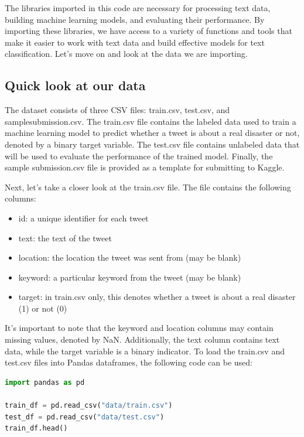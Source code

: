 \documentclass[11pt]{diazessay} %
\begin{document}
The libraries imported in this code are necessary for processing text data, building machine learning models, and evaluating their performance. By importing these libraries, we have access to a variety of functions and tools that make it easier to work with text data and build effective models for text classification. Let's move on and look at the data we are importing.

\subsection{Quick look at our data}

 The dataset consists of three CSV files: train.csv, test.csv, and sample\textunderscore submission.csv. The train.csv file contains the labeled data used to train a machine learning model to predict whether a tweet is about a real disaster or not, denoted by a binary target variable. The test.csv file contains unlabeled data that will be used to evaluate the performance of the trained model. Finally, the sample \textunderscore submission.csv file is provided as a template for submitting to Kaggle.

Next, let's take a closer look at the train.csv file. The file contains the following columns:
\begin{itemize}
\item id: a unique identifier for each tweet
\item text: the text of the tweet
\item location: the location the tweet was sent from (may be blank)
\item keyword: a particular keyword from the tweet (may be blank)
\item target: in train.csv only, this denotes whether a tweet is about a real disaster (1) or not (0)
\end{itemize}

It's important to note that the keyword and location columns may contain missing values, denoted by NaN. Additionally, the text column contains text data, while the target variable is a binary indicator. To load the train.csv and test.csv files into Pandas dataframes, the following code can be used:

\begin{lstlisting}[language=Python]
import pandas as pd

train_df = pd.read_csv("data/train.csv")
test_df = pd.read_csv("data/test.csv")
train_df.head()
\end{lstlisting}
\end{document}

